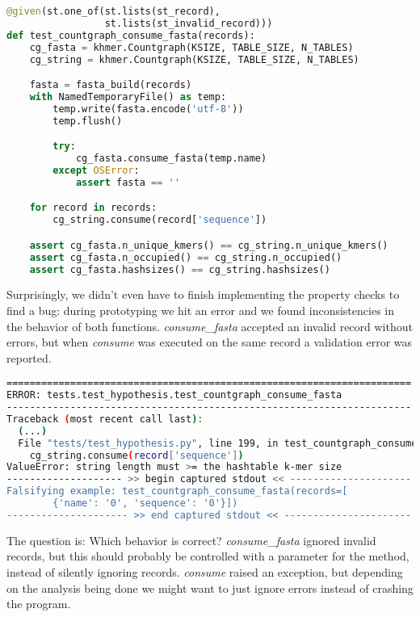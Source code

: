 \documentclass[preprint,nocopyrightspace]{sig-alternate}
\begin{document}
\begin{lstlisting}[language=Python,basicstyle=\tiny\tt,caption={Countgraph sequence consumption test},label={CountgraphTest}]
@given(st.one_of(st.lists(st_record),
                 st.lists(st_invalid_record)))
def test_countgraph_consume_fasta(records):
    cg_fasta = khmer.Countgraph(KSIZE, TABLE_SIZE, N_TABLES)
    cg_string = khmer.Countgraph(KSIZE, TABLE_SIZE, N_TABLES)

    fasta = fasta_build(records)
    with NamedTemporaryFile() as temp:
        temp.write(fasta.encode('utf-8'))
        temp.flush()

        try:
            cg_fasta.consume_fasta(temp.name)
        except OSError:
            assert fasta == ''

    for record in records:
        cg_string.consume(record['sequence'])

    assert cg_fasta.n_unique_kmers() == cg_string.n_unique_kmers()
    assert cg_fasta.n_occupied() == cg_string.n_occupied()
    assert cg_fasta.hashsizes() == cg_string.hashsizes()
\end{lstlisting}

Surprisingly,
we didn't even have to finish implementing the property checks to find a bug:
during prototyping we hit an error and we found inconsistencies in the behavior of both functions.
\emph{consume\_fasta} accepted an invalid record without errors,
but when \emph{consume} was executed on the same record a validation error was reported.

\begin{lstlisting}[language=Bash,basicstyle=\tiny\tt,caption={Inconsistent behavior between consume\_fasta and consume},label={CountgraphConsumeOutput}]
======================================================================
ERROR: tests.test_hypothesis.test_countgraph_consume_fasta
----------------------------------------------------------------------
Traceback (most recent call last):
  (...)
  File "tests/test_hypothesis.py", line 199, in test_countgraph_consume_fasta
    cg_string.consume(record['sequence'])
ValueError: string length must >= the hashtable k-mer size
-------------------- >> begin captured stdout << ---------------------
Falsifying example: test_countgraph_consume_fasta(records=[
		{'name': '0', 'sequence': '0'}])
--------------------- >> end captured stdout << ----------------------
\end{lstlisting}

The question is: Which behavior is correct? \emph{consume\_fasta} ignored invalid records,
but this should probably be controlled with a parameter for the method,
instead of silently ignoring records.
\emph{consume} raised an exception,
but depending on the analysis being done we might want to just ignore errors instead of crashing the program.
\end{document}
